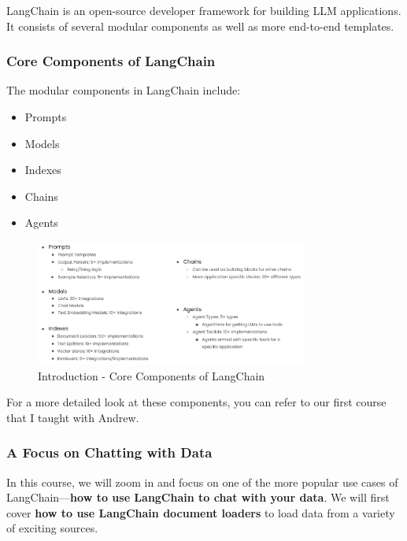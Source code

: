 \documentclass{article}
\begin{document}
LangChain is an open-source developer framework for building LLM applications. It consists of several modular components as well as more end-to-end templates.

\subsubsection{Core Components of LangChain}

The modular components in LangChain include:

\begin{itemize}
    \item Prompts
    \item Models
    \item Indexes
    \item Chains
    \item Agents
\end{itemize}

\begin{figure}[H]
    \centering
    \includegraphics[width=0.8\textwidth]{images/langchain_chat_with_your_data_001.png}
    \caption{Introduction - Core Components of LangChain}
    \label{fig:introduction_core_components_of_langchain}
\end{figure}

For a more detailed look at these components, you can refer to our first course that I taught with Andrew.

\subsubsection{A Focus on Chatting with Data}

In this course, we will zoom in and focus on one of the more popular use cases of LangChain—\textbf{how to use LangChain to chat with your data}. We will first cover \textbf{how to use LangChain document loaders} to load data from a variety of exciting sources.
\end{document}
